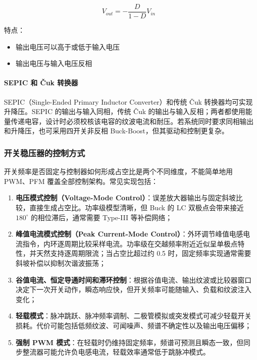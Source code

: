 \begin{equation}
V_{out} = -\frac{D}{1 - D} V_{in} \label{eq:buck-boost-output}
\end{equation}

特点：
\begin{itemize}
  \item 输出电压可以高于或低于输入电压
  \item 输出电压与输入电压反相
\end{itemize}

\paragraph{SEPIC 和 \texorpdfstring{\v{C}uk}{Cuk} 转换器}

SEPIC（Single-Ended Primary Inductor Converter）和传统 \v{C}uk 转换器均可实现升降压。SEPIC 的输出与输入同相，传统 \v{C}uk 的输出与输入反相；两者都使用能量传递电容，设计时必须校核该电容的纹波电流和耐压。若系统同时要求同相输出和升降压，也可采用四开关非反相 Buck-Boost，但其驱动和控制更复杂。

\subsubsection{开关稳压器的控制方式}

开关频率是否固定与控制器如何形成占空比是两个不同维度，不能简单地用 PWM、PFM 覆盖全部控制架构。常见实现包括：

\begin{enumerate}
  \item \textbf{电压模式控制（Voltage-Mode Control）}：误差放大器输出与固定斜坡比较，直接生成占空比。功率级模型清晰，但 Buck 的 LC 双极点会带来接近 $180^\circ$ 的相位滞后，通常需要 Type-III 等补偿网络；
  \item \textbf{峰值电流模式控制（Peak Current-Mode Control）}：外环调节峰值电感电流指令，内环逐周期比较采样电流。功率级在交越频率附近近似呈单极点特性，并天然支持逐周期限流；当占空比超过约 0.5 时，固定频率实现通常需要斜坡补偿以抑制次谐波振荡；
  \item \textbf{谷值电流、恒定导通时间和滞环控制}：根据谷值电流、输出纹波或比较器窗口决定下一次开关动作，瞬态响应快，但开关频率可能随输入、负载和纹波注入变化；
  \item \textbf{轻载模式}：脉冲跳跃、脉冲频率调制、二极管模拟或突发模式可减少轻载开关损耗。代价可能包括低频纹波、可闻噪声、频谱不确定性以及输出电压偏移；
  \item \textbf{强制 PWM 模式}：在轻载时仍维持固定频率，频谱可预测且瞬态一致，但同步整流器可能允许负电感电流，轻载效率通常低于跳脉冲模式。
\end{enumerate}

